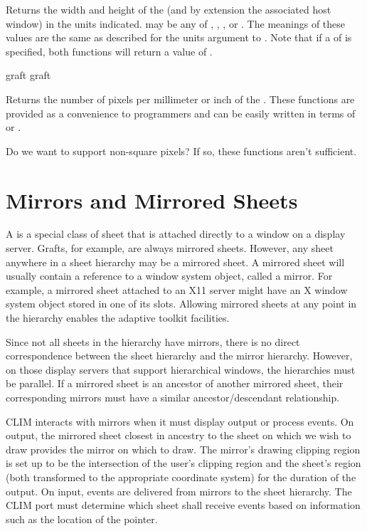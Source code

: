 Returns the width and height of the   (and by extension
the associated host window) in the units indicated.   may be any of
, , , or .  The
meanings of these values are the same as described for the units argument to
.  Note that if a  of  is specified, both
functions will return a value of .

 {graft}
 {graft}

Returns the number of pixels per millimeter or inch of the 
.  These functions are provided as a convenience to programmers and
can be easily written in terms of  or .

 {Do we want to support non-square pixels?  If so, these functions
aren't sufficient.}


\section {Mirrors and Mirrored Sheets}

A  is a special class of sheet that is attached directly
to a window on a display server.  Grafts, for example, are always mirrored
sheets.  However, any sheet anywhere in a sheet hierarchy may be a mirrored
sheet.  A mirrored sheet will usually contain a reference to a window system
object, called a mirror.  For example, a mirrored sheet attached to an X11
server might have an X window system object stored in one of its slots.
Allowing mirrored sheets at any point in the hierarchy enables the adaptive
toolkit facilities.

Since not all sheets in the hierarchy have mirrors, there is no direct
correspondence between the sheet hierarchy and the mirror hierarchy.  However,
on those display servers that support hierarchical windows, the hierarchies must
be parallel.  If a mirrored sheet is an ancestor of another mirrored sheet,
their corresponding mirrors must have a similar ancestor/descendant
relationship.

CLIM interacts with mirrors when it must display output or process events.
On output, the mirrored sheet closest in ancestry to the sheet on which we wish
to draw provides the mirror on which to draw.  The mirror's drawing clipping
region is set up to be the intersection of the user's clipping region and the
sheet's region (both transformed to the appropriate coordinate system) for the
duration of the output.  On input, events are delivered from mirrors to the
sheet hierarchy.  The CLIM port must determine which sheet shall receive events
based on information such as the location of the pointer.

